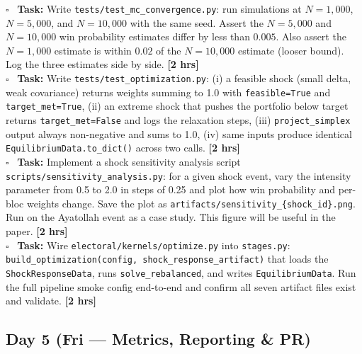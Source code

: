 \documentclass[11pt]{article}
\newcommand{\hrs}[1]{\textbf{[#1 hrs]}}
\newcommand{\dayhead}[2]{%
  \subsection*{Day #1 \normalfont\small\color{codegray}(#2)}}
\newcommand{\task}[2]{%
  \noindent\textbf{Task:} #1 \hfill \hrs{#2}\\}
\newcommand{\done}{\textcolor{sectionblue}{$\square$}\ }
\begin{document}
\begin{taskbox}
\done \task{Write \texttt{tests/test\_mc\_convergence.py}: run simulations at
  $N=1{,}000$, $N=5{,}000$, and $N=10{,}000$ with the same seed. Assert the
  $N=5{,}000$ and $N=10{,}000$ win probability estimates differ by less than
  $0.005$. Also assert the $N=1{,}000$ estimate is within $0.02$ of the
  $N=10{,}000$ estimate (looser bound). Log the three estimates side by side.}{2}

\done \task{Write \texttt{tests/test\_optimization.py}: (i) a feasible shock
  (small delta, weak covariance) returns weights summing to 1.0 with
  \texttt{feasible=True} and \texttt{target\_met=True}, (ii) an extreme
  shock that pushes the portfolio below target returns \texttt{target\_met=False}
  and logs the relaxation steps, (iii) \texttt{project\_simplex} output
  always non-negative and sums to 1.0, (iv) same inputs produce identical
  \texttt{EquilibriumData.to\_dict()} across two calls.}{2}

\done \task{Implement a shock sensitivity analysis script
  \texttt{scripts/sensitivity\_analysis.py}: for a given shock event,
  vary the intensity parameter from 0.5 to 2.0 in steps of 0.25 and
  plot how win probability and per-bloc weights change. Save the plot as
  \texttt{artifacts/sensitivity\_\{shock\_id\}.png}. Run on the Ayatollah
  event as a case study. This figure will be useful in the paper.}{2}

\done \task{Wire \texttt{electoral/kernels/optimize.py} into \texttt{stages.py}:
  \texttt{build\_optimization(config, shock\_response\_artifact)} that loads
  the \texttt{ShockResponseData}, runs \texttt{solve\_rebalanced}, and writes
  \texttt{EquilibriumData}. Run the full pipeline smoke config end-to-end
  and confirm all seven artifact files exist and validate.}{2}
\end{taskbox}

\dayhead{5}{Fri --- Metrics, Reporting \& PR}
\end{document}
